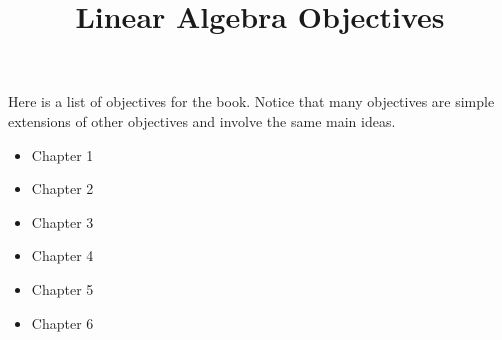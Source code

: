 \documentclass[letterpaper,oneside]{article}
\begin{document}
\title{Linear Algebra Objectives}
\maketitle

Here is a list of objectives for the book.  Notice that many
objectives are simple extensions of other objectives and involve the
same main ideas.  

\begin{itemize}
\item Chapter 1

\item Chapter 2

\item Chapter 3

\item Chapter 4

\item Chapter 5

\item Chapter 6

%
\end{itemize}
\end{document}
